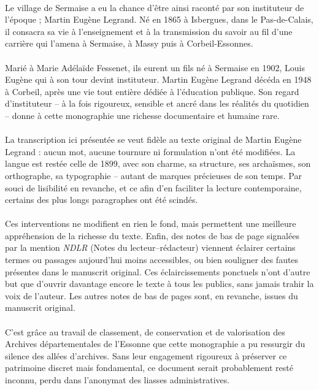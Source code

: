 \documentclass[../eBook.tex]{subfiles}
\begin{document}
    \paragraph{}Le village de Sermaise a eu la chance d'être ainsi raconté par son instituteur de l'époque ; Martin Eugène Legrand. Né en 1865 à Isbergues, dans le Pas-de-Calais, il consacra sa vie à l'enseignement et à la transmission du savoir au fil d'une carrière qui l'amena à Sermaise, à Massy puis à Corbeil-Essonnes.
    \paragraph{}Marié à Marie Adélaïde Fessenet, ils eurent un fils né à Sermaise en 1902, Louis Eugène qui à son tour devint instituteur. Martin Eugène Legrand décéda en 1948 à Corbeil, après une vie tout entière dédiée à l'éducation publique. Son regard d'instituteur -- à la fois rigoureux, sensible et ancré dans les réalités du quotidien -- donne à cette monographie une richesse documentaire et humaine rare.
    \paragraph{}La transcription ici présentée se veut fidèle au texte original de Martin Eugène Legrand : aucun mot, aucune tournure ni formulation n'ont été modifiées. La langue est restée celle de 1899, avec son charme, sa structure, ses archaïsmes, son orthographe, sa typographie -- autant de marques précieuses de son temps.  Par souci de lisibilité en revanche, et ce afin d'en faciliter la lecture contemporaine, certains des plus longs paragraphes ont été scindés.
    \paragraph{}Ces interventions ne modifient en rien le fond, mais permettent une meilleure appréhension de la richesse du texte. Enfin, des notes de bas de page signalées par la mention \textit{NDLR} (Notes du lecteur--rédacteur) viennent éclairer certains termes ou passages aujourd'hui moins accessibles, ou bien souligner des fautes présentes dans le manuscrit original. Ces éclaircissements ponctuels n'ont d'autre but que d'ouvrir davantage encore le texte à tous les publics, sans jamais trahir la voix de l'auteur. Les autres notes de bas de pages sont, en revanche, issues du manuscrit original.
    \paragraph{}C'est grâce au travail de classement, de conservation et de valorisation des Archives départementales de l'Essonne que cette monographie a pu ressurgir du silence des allées d'archives. Sans leur engagement rigoureux à préserver ce patrimoine discret mais fondamental, ce document serait probablement resté inconnu, perdu dans l'anonymat des liasses administratives.
\end{document}
